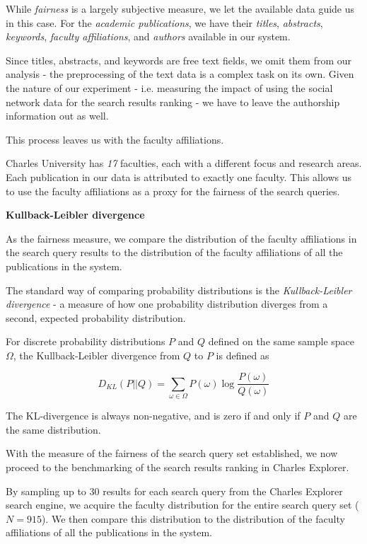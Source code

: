 While \textit{fairness} is a largely subjective measure, we let the available data guide us in this case.
For the \textit{academic publications}, we have their \textit{titles}, \textit{abstracts}, \textit{keywords}, \textit{faculty affiliations}, and \textit{authors} available in our system.

Since titles, abstracts, and keywords are free text fields, we omit them from our analysis - the preprocessing of the text data is a complex task on its own.
Given the nature of our experiment - i.e. measuring the impact of using the social network data for the search results ranking - we have to leave the authorship information out as well.

This process leaves us with the faculty affiliations.

Charles University has \textit{17} faculties, each with a different focus and research areas.
Each publication in our data is attributed to exactly one faculty.
This allows us to use the faculty affiliations as a proxy for the fairness of the search queries.

\textbf{Kullback-Leibler divergence}

As the fairness measure, we compare the distribution of the faculty affiliations in the search query results 
to the distribution of the faculty affiliations of all the publications in the system.

The standard way of comparing probability distributions is the \textit{Kullback-Leibler divergence} - a measure of how one probability distribution diverges from a second, expected probability distribution.

For discrete probability distributions $P$ and $Q$ defined on the same sample space $\Omega$, the Kullback-Leibler divergence from $Q$ to $P$ is defined as

$$
D_{KL}(P||Q) = \sum_{\omega \in \Omega} P(\omega) \log \frac{P(\omega)}{Q(\omega)}
$$

The KL-divergence is always non-negative, and is zero if and only if $P$ and $Q$ are the same distribution.

With the measure of the fairness of the search query set established, we now proceed to the benchmarking of the search results ranking in Charles Explorer.

By sampling up to 30 results for each search query from the Charles Explorer search engine, we acquire the faculty distribution for the entire search query set ($N = 915$).
We then compare this distribution to the distribution of the faculty affiliations of all the publications in the system.

